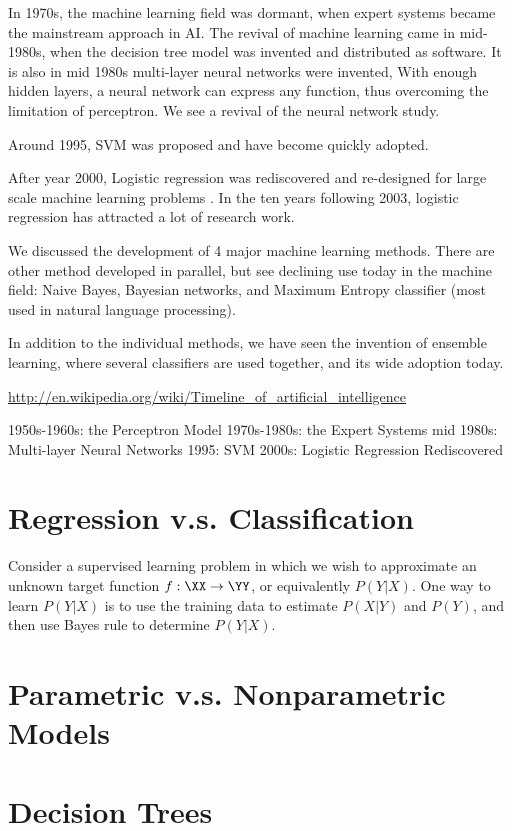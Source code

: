 In 1970s, the machine learning field was dormant, when expert systems became the mainstream approach in AI.  The revival of machine learning came in mid-1980s, when the decision tree model was invented and distributed as software. It is also in mid 1980s multi-layer neural networks were invented, With enough hidden layers, a neural network can express any function, thus overcoming the limitation of perceptron. We see a revival of the neural network study.

Around 1995, SVM was proposed and have become quickly adopted.

After year 2000, Logistic regression was rediscovered and re-designed for large scale machine learning problems . In the ten years following 2003, logistic regression has attracted a lot of research work.

We discussed the development of 4 major machine learning methods. There are other method developed in parallel, but see declining use today in the machine field: Naive Bayes, Bayesian networks, and Maximum Entropy classifier (most used in natural language processing).

In addition to the individual methods, we have seen the invention of ensemble learning, where several classifiers are used together, and its wide adoption today.


\url{http://en.wikipedia.org/wiki/Timeline_of_artificial_intelligence}

1950s-1960s: the Perceptron Model
1970s-1980s: the Expert Systems
mid 1980s: Multi-layer Neural Networks
1995: SVM
2000s: Logistic Regression Rediscovered



\section{Regression v.s. Classification}
Consider a supervised learning problem in which we wish to approximate an unknown target function $f: \XX \to \YY$, or equivalently $P(Y|X)$. One way to learn $P(Y|X)$ is to use the training data to estimate $P(X|Y)$ and $P(Y)$, and then use Bayes rule to determine $P(Y|X)$.
\section{Parametric v.s. Nonparametric Models}
\section{Decision Trees}

